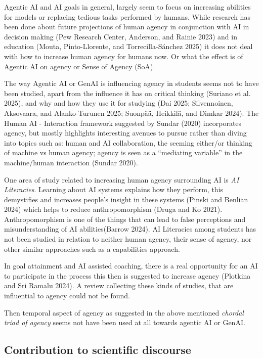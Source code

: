 \documentclass[
  letterpaper,
  DIV=11,
  numbers=noendperiod]{scrartcl}
\begin{document}
Agentic AI and AI goals in general, largely seem to focus on increasing
abilities for models or replacing tedious tasks performed by humans.
While research has been done about future projections of human agency in
conjunction with AI in decision making (Pew Research Center, Anderson,
and Rainie 2023) and in education (Mouta, Pinto-Llorente, and
Torrecilla-Sánchez 2025) it does not deal with how to increase human
agency for humans now. Or what the effect is of Agentic AI on agency or
Sense of Agency (SoA).

The way Agentic AI or GenAI is influencing agency in students seems not
to have been studied, apart from the influence it has on critical
thinking (Suriano et al. 2025), and why and how they use it for studying
(Dai 2025; Silvennoinen, Aksovaara, and Alanko-Turunen 2025; Suonpää,
Heikkilä, and Dimkar 2024). The Human AI - Interaction framework
suggested by Sundar (2020) incorporates agency, but mostly highlights
interesting avenues to pursue rather than diving into topics such as:
human and AI collaboration, the seeming either/or thinking of machine vs
human agency; agency is seen as a ``mediating variable'' in the
machine/human interaction (Sundar 2020).

One area of study related to increasing human agency surrounding AI is
\emph{AI Literacies}. Learning about AI systems explains how they
perform, this demystifies and increases people's insight in these
systems (Pinski and Benlian 2024) which helps to reduce anthropomorphism
(Druga and Ko 2021). Anthropomorphism is one of the things that can lead
to false perceptions and misunderstanding of AI abilities(Barrow 2024).
AI Literacies among students has not been studied in relation to neither
human agency, their sense of agency, nor other similar approaches such
as a capabilities approach.

In goal attainment and AI assisted coaching, there is a real opportunity
for an AI to participate in the process this then is suggested to
increase agency (Plotkina and Sri Ramalu 2024). A review collecting
these kinds of studies, that are influential to agency could not be
found.

Then temporal aspect of agency as suggested in the above mentioned
\emph{chordal triad of agency} seems not have been used at all towards
agentic AI or GenAI.

\subsection{Contribution to scientific
discourse}\label{contribution-to-scientific-discourse}
\end{document}
